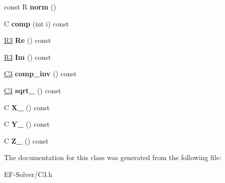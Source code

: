 \begin{DoxyCompactItemize}
\item 
const R {\bfseries norm} ()\hypertarget{class_c3_af172114c563471f19046b77913f6ec90}{}\label{class_c3_af172114c563471f19046b77913f6ec90}

\item 
C {\bfseries comp} (int i) const \hypertarget{class_c3_af3be89364b872601de601b6ff4c4d994}{}\label{class_c3_af3be89364b872601de601b6ff4c4d994}

\item 
\hyperlink{class_r3}{R3} {\bfseries Re} () const \hypertarget{class_c3_a800e4c66526c7a075858dda0f61e20ea}{}\label{class_c3_a800e4c66526c7a075858dda0f61e20ea}

\item 
\hyperlink{class_r3}{R3} {\bfseries Im} () const \hypertarget{class_c3_af1a704a6169094de981a0d86ee70bc13}{}\label{class_c3_af1a704a6169094de981a0d86ee70bc13}

\item 
\hyperlink{class_c3}{C3} {\bfseries comp\+\_\+inv} () const \hypertarget{class_c3_a24cf9c66e8b0a4ea0910c52ec0b23234}{}\label{class_c3_a24cf9c66e8b0a4ea0910c52ec0b23234}

\item 
\hyperlink{class_c3}{C3} {\bfseries sqrt\+\_\+} () const \hypertarget{class_c3_a9af6b869d34a169f5c934248453d6794}{}\label{class_c3_a9af6b869d34a169f5c934248453d6794}

\item 
C {\bfseries X\+\_\+} () const \hypertarget{class_c3_a4b44bc6e074a57f0773687a069d5d78a}{}\label{class_c3_a4b44bc6e074a57f0773687a069d5d78a}

\item 
C {\bfseries Y\+\_\+} () const \hypertarget{class_c3_a22f42721673604a7abf0f9e15e702c18}{}\label{class_c3_a22f42721673604a7abf0f9e15e702c18}

\item 
C {\bfseries Z\+\_\+} () const \hypertarget{class_c3_a6f78fe0691f4a1b035ea929e517fb510}{}\label{class_c3_a6f78fe0691f4a1b035ea929e517fb510}

\end{DoxyCompactItemize}


The documentation for this class was generated from the following file\+:\begin{DoxyCompactItemize}
\item 
E\+F-\/\+Solver/C3.\+h\end{DoxyCompactItemize}
